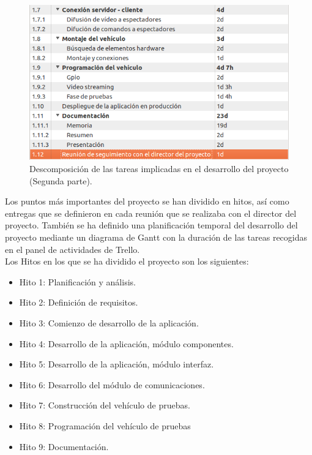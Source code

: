 \documentclass[a4paper,12pt]{article}
\begin{document}
\begin{figure}[H]
  \begin{center}
    \includegraphics[scale=0.6]{imagenes/descomposicion_tareas02.png}
  \end{center}
  \caption{Descomposición de las tareas implicadas en el desarrollo del proyecto (Segunda parte).}
  \label{gantt:tareas02}
\end{figure}

Los puntos más importantes del proyecto se han dividido en hitos, así como entregas que se definieron en cada reunión que se realizaba con el director del proyecto. 
También se ha definido una planificación temporal del desarrollo del proyecto mediante un diagrama de Gantt con la duración de las tareas recogidas en el panel de actividades de Trello.\\

Los Hitos en los que se ha dividido el proyecto son los siguientes:

\begin{itemize}
 \item Hito 1: Planificación y análisis.
 \item Hito 2: Definición de requisitos.
 \item Hito 3: Comienzo de desarrollo de la aplicación.
 \item Hito 4: Desarrollo de la aplicación, módulo componentes.
 \item Hito 5: Desarrollo de la aplicación, módulo interfaz.
 \item Hito 6: Desarrollo del módulo de comunicaciones.
 \item Hito 7: Construcción del vehículo de pruebas.
 \item Hito 8: Programación del vehículo de pruebas
 \item Hito 9: Documentación.
\end{itemize}
\end{document}
